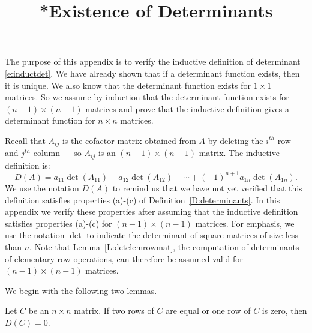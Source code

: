 \documentclass{ximera}
\title{*Existence of Determinants}
\begin{document}
\begin{abstract}
\end{abstract}
\maketitle


\label{A:det}

\newcommand{\Matrix}[1]{\ensuremath{\left[\begin{array}%
{ccccccccccccccccc} #1 \end{array}\right]}}


The purpose of this appendix is to verify the inductive
definition of determinant \eqref{e:inductdet}. We have already
shown that if a determinant function exists, then it is unique.
We also know that the determinant function exists for $1\times
1$ matrices. So we assume by induction that the determinant function
exists for $(n-1)\times(n-1)$ matrices and prove that the
inductive definition gives a determinant function for $n\times
n$ matrices.  

Recall that $A_{ij}$ is the cofactor matrix obtained from $A$ by
deleting the $i^{th}$ row and $j^{th}$ column --- so $A_{ij}$ is
an $(n-1)\times(n-1)$ matrix.  The inductive definition is:
  
\[
D(A) = a_{11}\det(A_{11})-a_{12}\det(A_{12})+\cdots 
+(-1)^{n+1}a_{1n}\det(A_{1n}).
\]
We use the notation $D(A)$ to remind us that we have not yet
verified that this definition satisfies properties (a)-(c) of
Definition~\ref{D:determinants}.  In this appendix we verify these
properties after assuming that the inductive definition
satisfies properties (a)-(c) for $(n-1)\times (n-1)$ matrices.
For emphasis, we use the notation $\det$ to indicate the
determinant of square matrices of size less than $n$.  Note 
that Lemma~\ref{L:detelemrowmat}, the computation of 
determinants of elementary row operations, can therefore 
be assumed valid for $(n-1)\times (n-1)$ matrices.

We begin with the following two lemmas.

\begin{lemma} \label{L:two_equal}
Let $C$ be an $n\times n$ matrix.  If two rows of  $C$ are equal 
or one row of $C$ is zero, then $D(C)=0$. 
\end{lemma}
\end{document}
